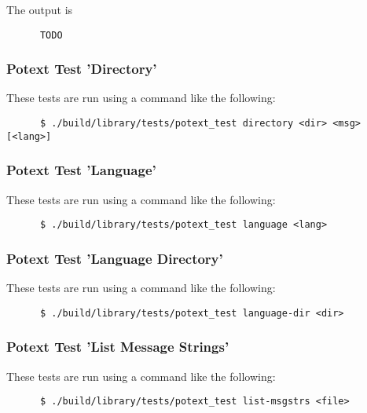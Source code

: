    The output is

   \begin{verbatim}
      TODO
   \end{verbatim}

\subsubsection{Potext Test 'Directory'}
\label{subsubsec:potext_test_directory}

   These tests are run using a command like the following:

   \begin{verbatim}
      $ ./build/library/tests/potext_test directory <dir> <msg> [<lang>]
   \end{verbatim}

\subsubsection{Potext Test 'Language'}
\label{subsubsec:potext_test_language}

   These tests are run using a command like the following:

   \begin{verbatim}
      $ ./build/library/tests/potext_test language <lang>
   \end{verbatim}

\subsubsection{Potext Test 'Language Directory'}
\label{subsubsec:potext_test_language_directory}

   These tests are run using a command like the following:

   \begin{verbatim}
      $ ./build/library/tests/potext_test language-dir <dir>
   \end{verbatim}

\subsubsection{Potext Test 'List Message Strings'}
\label{subsubsec:potext_test_list_message_strings}

   These tests are run using a command like the following:

   \begin{verbatim}
      $ ./build/library/tests/potext_test list-msgstrs <file>
   \end{verbatim}


